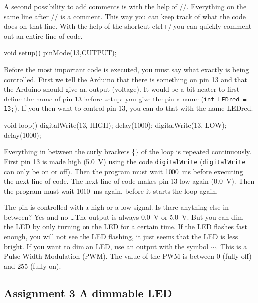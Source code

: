 \documentclass{arduino}
\begin{document}
\smallskip

A second possibility to add comments is with the help of //. Everything on the same line after // is a comment. This way you can keep track of what the code does on that line. With the help of the shortcut ctrl+/ you can quickly comment out an entire line of code.
\begin{marginlisting}
void setup(){
  pinMode(13,OUTPUT);
}
\end{marginlisting}

Before the most important code is executed, you must say what exactly is being controlled. First we tell the Arduino that there is something on pin 13 and that the Arduino should give an output (voltage). It would be a bit neater to first define the name of pin 13 before setup: you give the pin a name (\lstinline{int LEDred = 13;}). If you then want to control pin 13, you can do that with the name LEDred.
\begin{marginlisting}
void loop() {
  digitalWrite(13, HIGH);
  delay(1000);
  digitalWrite(13, LOW);
  delay(1000);
}
\end{marginlisting}

Everything in between the curly brackets \{\} of the loop is repeated continuously. First pin 13 is made high (\SI{5.0}{\volt}) using the code \lstinline{digitalWrite} (\lstinline{digitalWrite} can only be on or off). Then the program must wait \SI{1000}{\milli\s} before executing the next line of code. The next line of code makes pin 13 low again (\SI{0.0}{\volt}). Then the program must wait \SI{1000}{\milli\s} again, before it starts the loop again.


The pin is controlled with a high or a low signal. Is there anything else in between? Yes and no \dots The output is always \SI{0.0}{\volt} or \SI{5.0}{\volt}. But you can dim the LED by only turning on the LED for a certain time. If the LED flashes fast enough, you will not see the LED flashing, it just seems that the LED is less bright. If you want to dim an LED, use an output with the symbol $\sim$. This is a Pulse Width Modulation (PWM). The value of the PWM is between 0 (fully off) and 255 (fully on).
\newpage

\subsection{Assignment 3 A dimmable LED}

\end{document}
